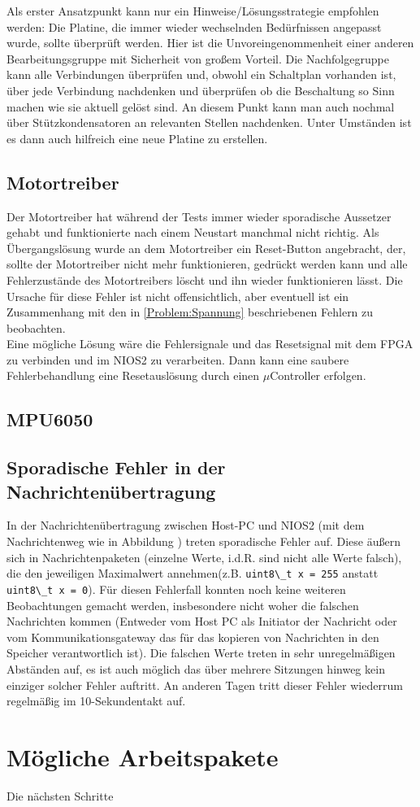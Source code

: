 Als erster Ansatzpunkt kann nur ein Hinweise/Lösungsstrategie empfohlen werden: Die Platine, die immer wieder wechselnden Bedürfnissen angepasst wurde, sollte überprüft werden. Hier ist die Unvoreingenommenheit einer anderen Bearbeitungsgruppe mit Sicherheit von großem Vorteil. Die Nachfolgegruppe kann alle Verbindungen überprüfen und, obwohl ein Schaltplan vorhanden ist, über jede Verbindung nachdenken und überprüfen ob die Beschaltung so Sinn machen wie sie aktuell gelöst sind. An diesem Punkt kann man auch nochmal über Stützkondensatoren an relevanten Stellen nachdenken. Unter Umständen ist es dann auch hilfreich eine neue Platine zu erstellen.

\subsection{Motortreiber}
Der Motortreiber hat während der Tests immer wieder sporadische Aussetzer gehabt und funktionierte nach einem Neustart manchmal nicht richtig. Als Übergangslösung wurde an dem Motortreiber ein Reset-Button angebracht, der, sollte der Motortreiber nicht mehr funktionieren, gedrückt werden kann und alle Fehlerzustände des Motortreibers löscht und ihn wieder funktionieren lässt.
Die Ursache für diese Fehler ist nicht offensichtlich, aber eventuell ist ein Zusammenhang mit den in \ref{Problem:Spannung} beschriebenen Fehlern zu beobachten.\\
Eine mögliche Lösung wäre die Fehlersignale und das Resetsignal mit dem \ac{FPGA} zu verbinden und im NIOS2 zu verarbeiten. Dann kann eine saubere Fehlerbehandlung eine Resetauslösung durch einen $\mu$Controller erfolgen.

\subsection{MPU6050}

\subsection{Sporadische Fehler in der Nachrichtenübertragung}
In der Nachrichtenübertragung zwischen Host-PC und NIOS2 (mit dem Nachrichtenweg wie in Abbildung ) treten sporadische Fehler auf. Diese äußern sich in Nachrichtenpaketen (einzelne Werte, i.d.R. sind nicht alle Werte falsch), die den jeweiligen Maximalwert annehmen(z.B. \lstinline|uint8\_t x = 255| anstatt \lstinline|uint8\_t x = 0|). Für diesen Fehlerfall konnten noch keine weiteren Beobachtungen gemacht werden, insbesondere nicht woher die falschen Nachrichten kommen (Entweder vom Host PC als Initiator der Nachricht oder vom Kommunikationsgateway das für das kopieren von Nachrichten in den Speicher verantwortlich ist). Die falschen Werte treten in sehr unregelmäßigen Abständen auf, es ist auch möglich das über mehrere Sitzungen hinweg kein einziger solcher Fehler auftritt. An anderen Tagen tritt dieser Fehler wiederrum regelmäßig im 10-Sekundentakt auf.

\section{Mögliche Arbeitspakete}
Die nächsten Schritte